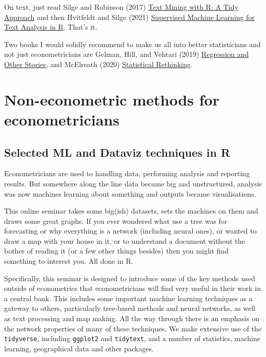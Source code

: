 \documentclass[
  letterpaper,
]{book}
\begin{document}
On text, just read Silge and Robinson (2017)
\href{https://www.tidytextmining.com/}{Text Mining with R: A Tidy
Approach} and then Hvitfeldt and Silge (2021)
\href{https://smltar.com/}{Supervised Machine Learning for Text Analysis
in R}. That's it.

Two books I would solidly recommend to make us all into better
statisticians and not just econometricians are Gelman, Hill, and Vehtari
(2019) \href{http://www.stat.columbia.edu/~gelman/regression}{Regression
and Other Stories}, and McElreath (2020)
\href{https://github.com/rmcelreath/rethinking}{Statistical Rethinking}.

\hypertarget{non-econometric-methods-for-econometricians}{%
\chapter{Non-econometric methods for
econometricians}\label{non-econometric-methods-for-econometricians}}

\hypertarget{selected-ml-and-dataviz-techniques-in-r}{%
\section{Selected ML and Dataviz techniques in
R}\label{selected-ml-and-dataviz-techniques-in-r}}

Econometricians are used to handling data, performing analysis and
reporting results. But somewhere along the line data became big and
unstructured, analysis was now machines learning about something and
outputs became visualisations.

This online seminar takes some big(ish) datasets, sets the machines on
them and draws some great graphs. If you ever wondered what use a tree
was for forecasting or why everything is a network (including neural
ones), or wanted to draw a map with your house in it, or to understand a
document without the bother of reading it (or a few other things
besides) then you might find something to interest you. All done in R.

Specifically, this seminar is designed to introduce some of the key
methods used outside of econometrics that econometricians will find very
useful in their work in a central bank. This includes some important
machine learning techniques as a gateway to others, particularly
tree-based methods and neural networks, as well as text processing and
map making. All the way through there is an emphasis on the network
properties of many of these techniques. We make extensive use of the
\texttt{tidyverse}, including \texttt{ggplot2} and \texttt{tidytext},
and a number of statistics, machine learning, geographical data and
other packages.
\end{document}
